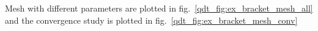



Mesh with different parameters are plotted in fig.~\ref{qdt_fig:ex_bracket_mesh_all} and the convergence study is plotted in fig.~\ref{qdt_fig:ex_bracket_mesh_conv}

